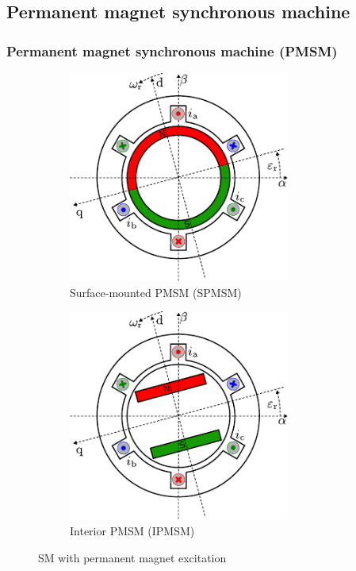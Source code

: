 \subsection{Permanent magnet synchronous machine}

\begin{frame}[c]
	\frametitle{Permanent magnet synchronous machine (PMSM)}
	\begin{figure}
		\centering
		\begin{subfigure}{0.49\textwidth}
			\centering
			\includegraphics[width=0.8\textwidth]{fig/lec07/SPMSM.pdf}
			\caption{Surface-mounted PMSM (SPMSM)}
		\end{subfigure}
		\hfill
		\begin{subfigure}{0.49\textwidth}
			\centering
			\includegraphics[width=0.8\textwidth]{fig/lec07/IPMSM.pdf}
			\caption{Interior PMSM (IPMSM)}
		\end{subfigure}
        \caption{SM with permanent magnet excitation} 
        \label{fig:PMSMs}
	\end{figure}
\end{frame}

